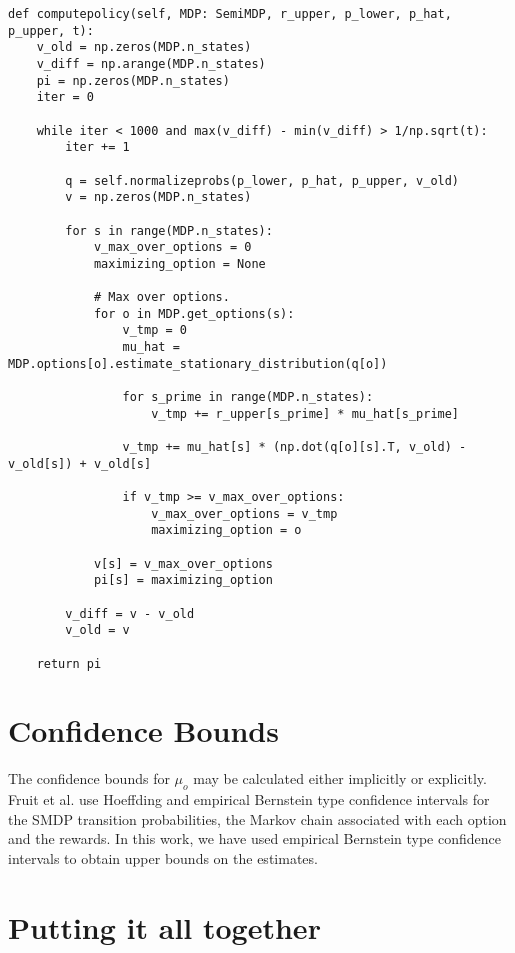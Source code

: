 \begin{verbatim}
def computepolicy(self, MDP: SemiMDP, r_upper, p_lower, p_hat, p_upper, t):
    v_old = np.zeros(MDP.n_states)
    v_diff = np.arange(MDP.n_states)
    pi = np.zeros(MDP.n_states)
    iter = 0

    while iter < 1000 and max(v_diff) - min(v_diff) > 1/np.sqrt(t):
        iter += 1

        q = self.normalizeprobs(p_lower, p_hat, p_upper, v_old)
        v = np.zeros(MDP.n_states)

        for s in range(MDP.n_states):
            v_max_over_options = 0
            maximizing_option = None

            # Max over options.
            for o in MDP.get_options(s):
                v_tmp = 0
                mu_hat = MDP.options[o].estimate_stationary_distribution(q[o])

                for s_prime in range(MDP.n_states):
                    v_tmp += r_upper[s_prime] * mu_hat[s_prime]

                v_tmp += mu_hat[s] * (np.dot(q[o][s].T, v_old) - v_old[s]) + v_old[s]

                if v_tmp >= v_max_over_options:
                    v_max_over_options = v_tmp
                    maximizing_option = o

            v[s] = v_max_over_options
            pi[s] = maximizing_option

        v_diff = v - v_old
        v_old = v

    return pi
\end{verbatim}

\section{Confidence Bounds}

The confidence bounds for $\mu_o$ may be calculated either implicitly or explicitly.
Fruit et al. \cite{fruit_regret_2017} use Hoeffding and empirical Bernstein type confidence intervals for the SMDP transition probabilities, the Markov chain associated with each option and the rewards.
In this work, we have used empirical Bernstein type confidence intervals to obtain upper bounds on the estimates.


\section{Putting it all together}

